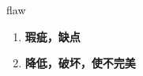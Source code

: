 
\begin{frame}
{\huge flaw}
\begin{center}
\begin{enumerate}\Large
  \item \textbf{瑕疵，缺点}
  \item \textbf{降低，破坏，使不完美}
\end{enumerate}
\end{center}
\end{frame}
